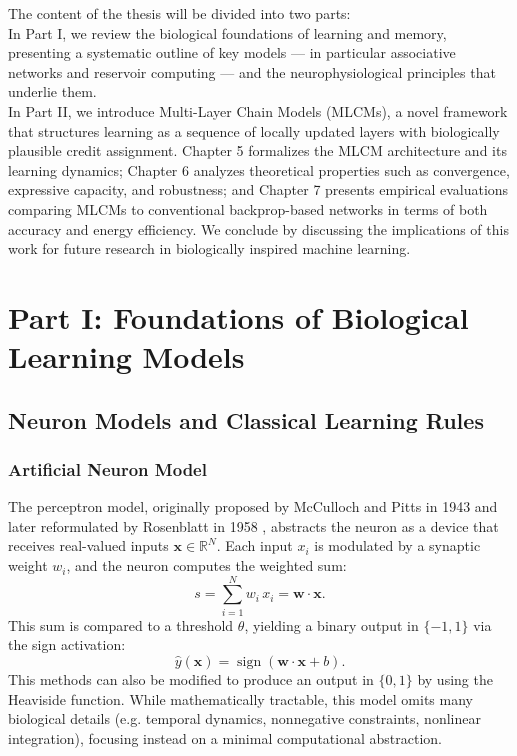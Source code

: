 \documentclass[a4paper,12pt]{report}
\begin{document}
The content of the thesis will be divided into two parts: \\ 
In Part I, we review the biological foundations of learning and memory, presenting a systematic 
outline of key models --- in particular associative networks and reservoir computing --- and the 
neurophysiological principles that underlie them. \\
{\color{red} In Part II, we introduce Multi-Layer Chain Models (MLCMs), a novel framework that structures learning 
as a sequence of locally updated layers with biologically plausible credit assignment. Chapter 5 
formalizes the MLCM architecture and its learning dynamics; Chapter 6 analyzes theoretical properties 
such as convergence, expressive capacity, and robustness; and Chapter 7 presents empirical 
evaluations comparing MLCMs to conventional backprop-based networks in terms of both accuracy and 
energy efficiency. We conclude by discussing the implications of this work for future research in 
biologically inspired machine learning.}






\part*{Part I: Foundations of Biological Learning Models}




\chapter{Neuron Models and Classical Learning Rules}
\section{Artificial Neuron Model}

The perceptron model, originally proposed by McCulloch and Pitts in 1943 \cite{McCulloch1943} and later 
reformulated by Rosenblatt in 1958 \cite{Rosenblatt1958}, abstracts the neuron as a device that receives 
real-valued inputs $\mathbf{x}\in\mathbb R^N$. Each input $x_i$ is modulated by a synaptic weight 
$w_i$, and the neuron computes the weighted sum:
\[
  s = \sum_{i=1}^N w_i\,x_i = \mathbf{w}\cdot\mathbf{x}.
\]
This sum is compared to a threshold $\theta$, yielding a binary output in $\{-1,1\}$ via the sign activation:
\[
  \hat y(\mathbf{x}) = \operatorname{sign}(\mathbf{w}\cdot\mathbf{x} + b).
\]
This methods can also be modified to produce an output in $\{0, 1\}$ by using the Heaviside function.
While mathematically tractable, this model omits many biological details (e.g. temporal dynamics, 
nonnegative constraints, nonlinear integration), focusing instead on a minimal computational abstraction.
\end{document}
